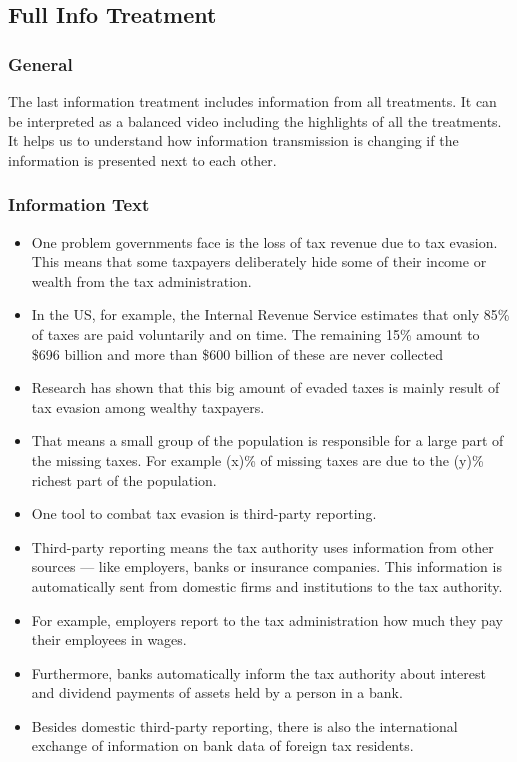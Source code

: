 \documentclass[11pt]{article}
\begin{document}
\subsection{Full Info Treatment}
\subsubsection*{General}
The last information treatment includes information from all treatments. It can be interpreted as a balanced video including the highlights of all the treatments. It helps us to understand how information transmission is changing if the information is presented next to each other. 
\subsubsection*{Information Text}
\begin{itemize}
    \item One problem governments face is the loss of tax revenue due to tax evasion. This means that some taxpayers deliberately hide some of their income or wealth from the tax administration. 
    \item In the US, for example, the Internal Revenue Service estimates that only 85\% of taxes are paid voluntarily and on time. The remaining 15\% amount to \$696 billion and more than \$600 billion of these are never collected
    \item Research has shown that this big amount of evaded taxes is mainly result of tax evasion among wealthy taxpayers.
    \item That means a small group of the population is responsible for a large part of the missing taxes. For example (x)\% of missing taxes are due to the (y)\% richest part of the population. 
    \item One tool to combat tax evasion is third-party reporting.
    \item Third-party reporting means the tax authority uses information from other sources --- like employers, banks or insurance companies. This information is automatically sent from domestic firms and institutions to the tax authority.
    \item For example, employers report to the tax administration how much they pay their employees in wages.
    \item Furthermore, banks automatically inform the tax authority about interest and dividend payments of assets held by a person in a bank. 
    \item Besides domestic third-party reporting, there is also the international exchange of information on bank data of foreign tax residents. %

\end{itemize}
\end{document}
